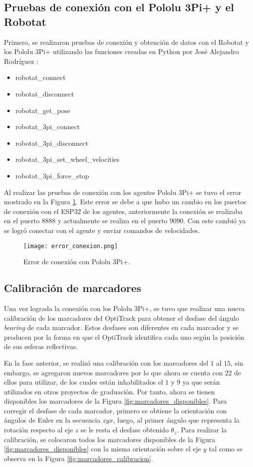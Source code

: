 \subsection{Pruebas de conexión con el Pololu 3Pi+ y el Robotat}
 Primero, se realizaron pruebas de conexión y obtención de datos con el Robotat y los Pololu 3Pi+ utilizando las funciones creadas en Python por José Alejandro Rodríguez \cite{RodriguezJA_2023_tesis}:
\begin{itemize}
	\item robotat\_connect
	\item robotat\_disconnect
	\item robotat\_get\_pose
	\item robotat\_3pi\_connect
	\item robotat\_3pi\_disconnect
	\item robotat\_3pi\_set\_wheel\_velocities
	\item robotat\_3pi\_force\_stop
\end{itemize}

Al realizar las pruebas de conexión con los agentes Pololu 3Pi+ se tuvo el error mostrado en la Figura \ref{fig:error_conexion}. Este error se debe a que hubo un cambio en los puertos de conexión con el ESP$32$ de los agentes, anteriormente la conexión se realizaba en el puerto $8888$ y actualmente se realiza en el puerto $9090$. Con este cambió ya se logró conectar con el agente y enviar comandos de velocidades.

\begin{figure}[H]
	\centering
	\texttt{[image: error\_conexion.png]}
	\caption{Error de conexión con Pololu 3Pi+.}
	\label{fig:error_conexion}
\end{figure}

\subsection{Calibración de marcadores}
Una vez lograda la conexión con los Pololu 3Pi+, se tuvo que realizar una nueva calibración de los marcadores del OptiTrack para obtener el desfase del ángulo \textit{bearing} de cada marcador. Estos desfases son diferentes en cada marcador y se producen por la forma en que el OptiTrack identifica cada uno según la posición de sus esferas reflectivas.

En la fase anterior, se realizó una calibración con los marcadores del $1$ al $15$, sin embargo, se agregaron nuevos marcadores por lo que ahora se cuenta con $22$ de ellos para utilizar, de los cuales están inhabilitados el $1$ y $9$ ya que serán utilizados en otros proyectos de graduación. Por tanto, ahora se tienen disponibles los marcadores de la Figura \ref{fig:marcadores_disponibles}. 
Para corregir el desfase de cada marcador, primero se obtiene la orientación con ángulos de Euler en la secuencia $zyx$, luego, al primer ángulo que representa la rotación respecto al eje $z$ se le resta el desfase obtenido $\theta_z$. Para realizar la calibración, se colocaron todos los marcadores disponibles de la Figura \ref{fig:marcadores_disponibles} con la misma orientación sobre el eje $y$ tal como se observa en la Figura \ref{fig:marcadores_calibracion}.

